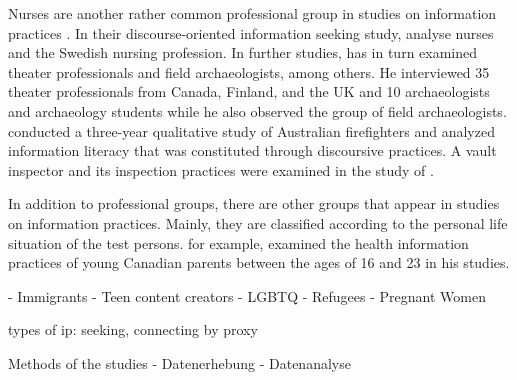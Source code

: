 \documentclass[12pt, a4paper, titlepage, oneside, abstract=true, toc=listof, toc=bibliography]{scrreprt}
\begin{document}
Nurses are another rather common professional group in studies on information practices \citep[e.g. ][]{Bonner2011, Johannisson2007, Mohammad2020}. In their discourse-oriented information seeking study, \citet{Johannisson2007} analyse nurses and the Swedish nursing profession. In further studies, \citet{Olsson2010, Olsson2016} has in turn examined theater professionals and field archaeologists, among others. He interviewed 35 theater professionals from Canada, Finland, and the UK and 10 archaeologists and archaeology students while he also observed the group of field archaeologists. \citep{Lloyd2007} conducted a three-year qualitative study of Australian firefighters and analyzed information literacy that was constituted through discoursive practices. A vault inspector and its inspection practices were examined in the study of \citep{Veinot2007}. 

In addition to professional groups, there are other groups that appear in studies on information practices. Mainly, they are classified according to the personal life situation of the test persons. \citet{Greyson2017, Greyson2018} for example, examined the health information practices of young Canadian parents between the ages of 16 and 23 in his studies.



\citep{Caidi2010} - Immigrants
\citep{Harlan2012} - Teen content creators
\citep{Kitzie2020} - LGBTQ
\citep{Lloyd2013} - Refugees
\citep{McKenzie2002, McKenzie2003, McKenzie2003a} - Pregnant Women



types of ip: seeking, connecting by proxy

Methods of the studies
 - Datenerhebung
 - Datenanalyse
\end{document}
